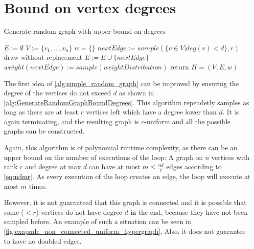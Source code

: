 \section{Bound on vertex degrees}
\begin{algorithm}
	\caption{Generate random graph with upper bound on degrees\label{alg:GenerateRandomGraphBoundDegrees}} 
	\begin{algorithmic}
		\State $E := \emptyset$
		\State $V := \{v_1, \ldots, v_n\}$
		\State $w = \{\}$
		\State $nextEdge := sample(\{v\in V| deg(v)< d\}, r) $ \Comment draw without replacement
		\State $E := E \cup \{nextEdge\}$
		\State $weight(nextEdge) := sample(weightDistribution)$ 
		\EndWhile
		\State  return $H = (V, E, w)$
		\EndFunction
	\end{algorithmic}
\end{algorithm}	
The first idea of \cref{alg:simple_random_graph} can be improved by ensuring the degree of the vertices do not exceed $d$ as shown in \cref{alg:GenerateRandomGraphBoundDegrees}. This algorithm repeadetly samples as long as there are at least $r$ vertices left which have a degree lower than $d$. It is again terminating,  and the resulting graph is $r$-uniform and all the possible graphs can be constructed.

Again, this algorithm is of polynomial runtime complexity, as there can be an upper bound on the number of executions of the loop: A graph on $n$ vertices with rank $r$ and degree at max $d$ can have at most $m \le \frac{nd}{r}$ edges according to \cref{eq:ndmr}. As every execution of the loop creates an edge, the loop will execute at most $m$ times. 



However, it is not guaranteed that this graph is connected and it is possible that some ($< r$) vertices do not have degree $d$ in the end, because they have not been sampled before. An example of such a situation can be seen in \cref{fig:exapmle_non_connected_uniform_hypergraph}.
Also, it does not guarantee to have no doubled edges.


